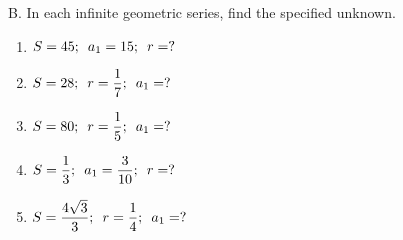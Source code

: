 B. In each infinite geometric series, find the specified unknown.   

\begin{enumerate}[label = \arabic*. ]


\item \hspce $\displaystyle S=45; \hspace{0.5em} a_1=15;\hspace{0.5em} r=?$
\item \hspce $\displaystyle S=28; \hspace{0.5em} r=\frac{1}{7};\hspace{0.5em} a_1=? $

\item \hspce $\displaystyle S=80; \hspace{0.5em} r=\frac{1}{5};\hspace{0.5em} a_1=? $
\item \hspce $\displaystyle S=\frac{1}{3}; \hspace{0.5em} a_1=\frac{3}{10};\hspace{0.5em} r=? $
\item \hspce $\displaystyle S=\frac{4\sqrt{3}}{3};\hspace{0.5em}  r=\frac{1}{4};\hspace{0.5em} a_1=? $


\end{enumerate}